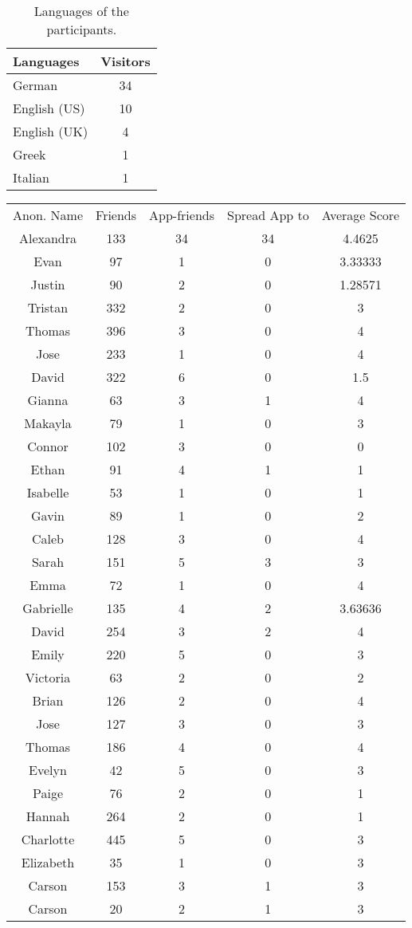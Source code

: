 \documentclass[preprint,12pt]{elsarticle}
\begin{document}
\begin{center}
\begin{table}
\begin{tabular}{l | c }
Languages   & Visitors \\
\hline
German  & 34 \\
English (US) & 10 \\
English (UK) & 4 \\
Greek  & 1 \\
Italian & 1 \\
\end{tabular}
\caption{Languages of the participants.}
\label{tab:languages}
\end{table}
\end{center}

\newpage

 \begin{table}
 \begin{tabular}{ c c c c c}
Anon. Name&Friends&App-friends&Spread App to&Average Score	\\
Alexandra & 133& 34& 34 & 4.4625 \\
Evan & 97& 1& 0 & 3.33333 \\
Justin & 90& 2& 0 & 1.28571 \\
Tristan & 332& 2& 0 & 3 \\
Thomas & 396& 3& 0 & 4 \\
Jose & 233& 1& 0 & 4 \\
David & 322& 6& 0 & 1.5 \\
Gianna & 63& 3& 1 & 4 \\
Makayla & 79& 1& 0 & 3 \\
Connor & 102& 3& 0 & 0 \\
Ethan & 91& 4& 1 & 1 \\
Isabelle & 53& 1& 0 & 1 \\
Gavin & 89& 1& 0 & 2 \\
Caleb & 128& 3& 0 & 4 \\
Sarah & 151& 5& 3 & 3 \\
Emma & 72& 1& 0 & 4 \\
Gabrielle & 135& 4& 2 & 3.63636 \\
David & 254& 3& 2 & 4 \\
Emily & 220& 5& 0 & 3 \\
Victoria & 63& 2& 0 & 2 \\
Brian & 126& 2& 0 & 4 \\
Jose & 127& 3& 0 & 3 \\
Thomas & 186& 4& 0 & 4 \\
Evelyn & 42& 5& 0 & 3 \\
Paige & 76& 2& 0 & 1 \\
Hannah & 264& 2& 0 & 1 \\
Charlotte & 445& 5& 0 & 3 \\
Elizabeth & 35& 1& 0 & 3 \\
Carson & 153& 3& 1 & 3 \\
Carson & 20& 2& 1 & 3


\end{tabular}
\end{table}
\end{document}
